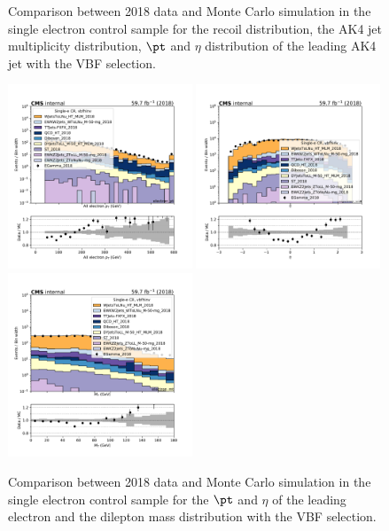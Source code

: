 {\begin{figure}[htbp]
\begin{center}
    \end{center}
    \caption{Comparison between 2018 data and Monte Carlo simulation in the single electron control sample for
        the recoil distribution, the AK4 jet multiplicity distribution,  $\pt$ and $\eta$ distribution
        of the leading AK4 jet with the VBF selection.}
    \label{fig:SE_vbfhinv_2018}
\end{figure}

\begin{figure}[htbp]
    \begin{center}
        \includegraphics[width=0.49\textwidth]{fig/datamc/cr_1e_vbf/cr_1e_vbf_electron_pt_losf_2018.pdf}
        \includegraphics[width=0.49\textwidth]{fig/datamc/cr_1e_vbf/cr_1e_vbf_electron_eta_losf_2018.pdf} \\
        \includegraphics[width=0.49\textwidth]{fig/datamc/cr_1e_vbf/cr_1e_vbf_electron_mt_losf_2018.pdf}
    \end{center}
    \caption{Comparison between 2018 data and Monte Carlo simulation in the single electron control sample for
        the $\pt$ and $\eta$ of the leading electron and the dilepton mass distribution with the VBF selection.}
    \label{fig:SE_2_vbfhinv_2018}
\end{figure}

}
